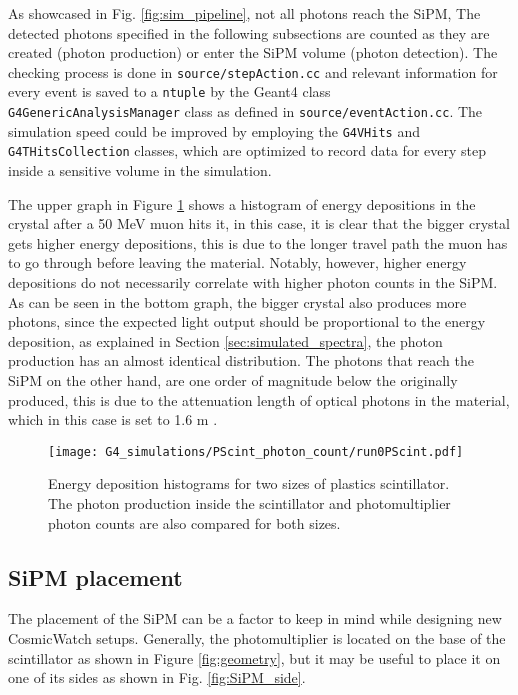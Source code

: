 As showcased in Fig. \ref{fig:sim_pipeline}, not all photons reach the SiPM, The detected photons specified in the following subsections are counted as they are created (photon production) or enter the SiPM volume (photon detection). The checking process is done in \texttt{source/stepAction.cc} and relevant information for every event is saved to a \texttt{ntuple} by the Geant4 class\\ \texttt{G4GenericAnalysisManager} class as defined in \texttt{source/eventAction.cc}. The simulation speed could be improved by employing the \texttt{G4VHits} and \texttt{G4THitsCollection} classes, which are optimized to record data for every step inside a sensitive volume in the simulation.

The upper graph in Figure \ref{fig:LYSO_PScint_phot_count} shows a histogram of energy depositions in the crystal after a 50 \unit{\mega\eV} muon hits it, in this case, it is clear that the bigger crystal gets higher energy depositions, this is due to the longer travel path the muon has to go through before leaving the material. Notably, however, higher energy depositions do not necessarily correlate with higher photon counts in the SiPM. As can be seen in the bottom graph, the bigger crystal also produces more photons, since the expected light output should be proportional to the energy deposition, as explained in Section \ref{sec:simulated_spectra}, the photon production has an almost identical distribution. The photons that reach the SiPM on the other hand, are one order of magnitude below the originally produced, this is due to the attenuation length of optical photons in the material, which in this case is set to 1.6 \unit{\m} \cite{Luxium_plastic}.

\begin{figure}[H]
  \centering
  \texttt{[image: G4\_simulations/PScint\_photon\_count/run0PScint.pdf]}
  \caption{\label{fig:LYSO_PScint_phot_count}Energy deposition histograms for two sizes of plastics scintillator. The photon production inside the scintillator and photomultiplier photon counts are also compared for both sizes.}
\end{figure}

\subsection{SiPM placement}\label{sec:SiPM_placement}

The placement of the SiPM can be a factor to keep in mind while designing new CosmicWatch setups. Generally, the photomultiplier is located on the base of the scintillator as shown in Figure \ref{fig:geometry}, but it may be useful to place it on one of its sides as shown in Fig. \ref{fig:SiPM_side}.

